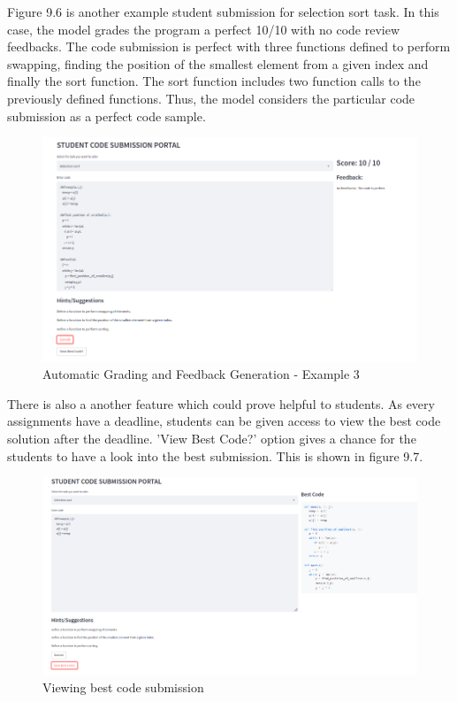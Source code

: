 Figure 9.6 is another example student submission for selection sort task. In this case, the model grades the program a perfect 10/10 with no code review feedbacks. The code submission is perfect with three functions defined to perform swapping, finding the position of the smallest element from a given index and finally the sort function. The sort function includes two function calls to the previously defined functions. Thus, the model considers the particular code submission as a perfect code sample. 

\newpage

\begin{figure}[H]
\centering
\includegraphics[scale=0.6,frame]{./figures/dep6.png}
\caption{Automatic Grading and Feedback Generation - Example 3}
\label{fig5}
\end{figure}

There is also a another feature which could prove helpful to students. As every assignments have a deadline, students can be given access to view the best  code solution after the deadline. 'View Best Code?' option gives a chance for the students to have a look into the best submission. This is shown in figure 9.7.


\begin{figure}[H]
\centering
\includegraphics[scale=0.54,frame]{./figures/dep7.png}
\caption{Viewing best code submission}
\label{fig5}
\end{figure}



